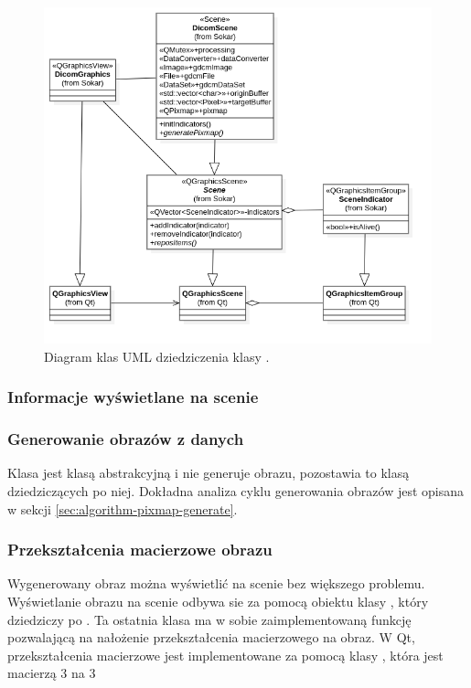 \begin{figure}[!htbp]
    \centering
    \includegraphics[width=\textwidth]{img/uml/dicom-scene-layers.png}
    \caption{Diagram klas UML dziedziczenia klasy .}
    \label{uml:sokar-scene-layers}
\end{figure}


\subsubsection{Informacje wyświetlane na scenie}


\subsubsection{Generowanie obrazów z danych}

Klasa  jest klasą abstrakcyjną i nie generuje obrazu, pozostawia to klasą dziedziczących po niej.
Dokładna analiza cyklu generowania obrazów jest opisana w sekcji \ref{sec:algorithm-pixmap-generate}.

\subsubsection{Przekształcenia macierzowe obrazu}

\par
Wygenerowany obraz można wyświetlić na scenie bez większego problemu.
Wyświetlanie obrazu na scenie odbywa sie za pomocą obiektu klasy , który dziedziczy po .
Ta ostatnia klasa ma w sobie zaimplementowaną funkcję pozwalającą na nałożenie przekształcenia macierzowego na obraz.
W Qt, przekształcenia macierzowe jest implementowane za pomocą klasy , która jest macierzą 3 na 3

